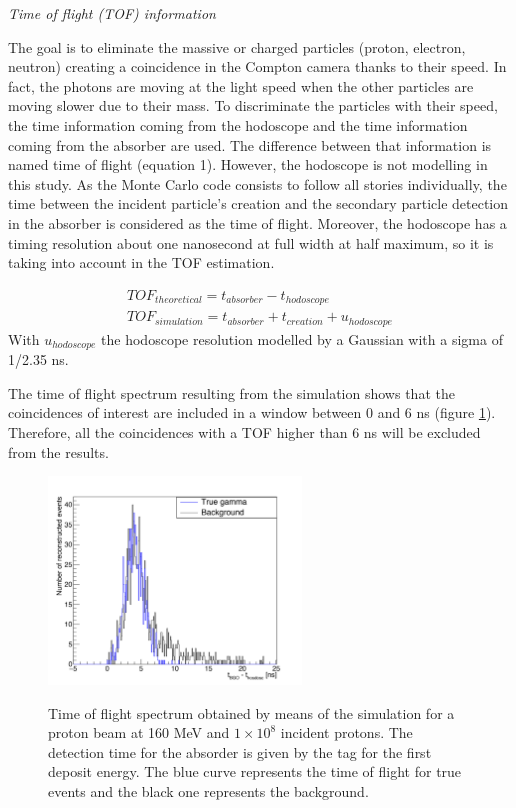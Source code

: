 \textit{Time of flight (TOF) information}\newline

The goal is to eliminate the massive or charged particles (proton, electron, neutron) creating a coincidence in the Compton camera thanks to their speed. In fact, the photons are moving at the light speed when the other particles are moving slower due to their mass. To discriminate the particles with their speed, the time information coming from the hodoscope and the time information coming from the absorber are used. The difference between that information is named time of flight (equation 1). However, the hodoscope is not modelling in this study. As the Monte Carlo code consists to follow all stories individually, the time between the incident particle's creation and the secondary particle detection in the absorber is considered as the time of flight. Moreover, the hodoscope has a timing resolution about one nanosecond at full width at half maximum, so it is taking into account in the TOF estimation.

\begin{eqnarray*}
TOF_{theoretical} = t_{absorber}-t_{hodoscope}\\
TOF_{simulation} = t_{absorber}+t_{creation} + u_{hodoscope}
\end{eqnarray*}
With $u_{hodoscope}$  the hodoscope resolution modelled by a Gaussian with a sigma of 1/2.35 ns. 

The time of flight spectrum resulting from the simulation shows that the coincidences of interest are included in a window between 0 and 6 ns (figure \ref{fig:fig_TOF_distribution_CC_simulation_Hadronth}). Therefore, all the coincidences with a TOF higher than 6 ns will be excluded from the results. 

	\begin{figure} [!hbtp]	
	\centering
	\caption{Time of flight spectrum obtained by means of the simulation for a proton beam at 160 MeV and $1\times10^{8}$ incident protons. The detection time for the absorder is given by the tag for the first deposit energy. The blue curve represents the time of flight for true events and the black one represents the background.}	
	\includegraphics[width=0.6\textwidth]{./Figure/2015_01_04_TOF_spectra_NoCut_1Proton_ResolTemporelle_applied_these.jpg}
	\label{fig:fig_TOF_distribution_CC_simulation_Hadronth}
	\end{figure}

